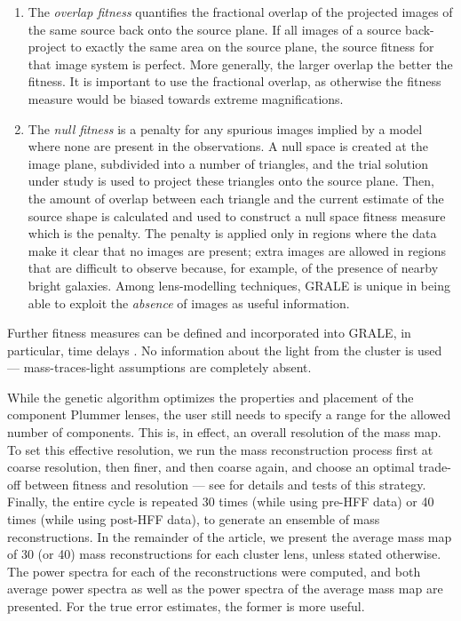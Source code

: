 \documentclass[
  11pt,
  twoside,
  openright,
  titlepage,
  headings=optiontoheadandtoc
]{scrbook}
\begin{document}
\begin{enumerate}

\item The {\em overlap fitness\/} quantifies the fractional overlap of
  the projected images of the same source back onto the source plane.
  If all images of a source back-project to exactly the same area on
  the source plane, the source fitness for that image system is
  perfect.  More generally, the larger overlap the better the fitness.
  It is important to use the fractional overlap, as otherwise the
  fitness measure would be biased towards extreme magnifications.

\item The {\em null fitness\/} is a penalty for any spurious images
  implied by a model where none are present in the observations.
  A null space is created at the image plane, subdivided into a number of
  triangles, and the trial solution
  under study is used to project these triangles onto the source plane. Then, the
  amount of overlap between each triangle and the current estimate of the source
  shape is calculated and used to construct a null space fitness measure which
  is the penalty. The
  penalty is applied only in regions where the data make it clear that
  no images are present; extra images are allowed in regions that are
  difficult to observe because, for example, of the presence of nearby
  bright galaxies.  Among lens-modelling techniques, GRALE is unique
  in being able to exploit the {\em absence\/} of images as useful
  information.

\end{enumerate}

Further fitness measures can be defined and incorporated into GRALE,
in particular, time delays
\citep{2009MNRAS.397..341L,2015PASJ...67...21M}.  No information about
the light from the cluster is used --- mass-traces-light assumptions
are completely absent.

While the genetic algorithm optimizes the properties and placement of
the component Plummer lenses, the user still needs to specify a range
for the allowed number of components.  This is, in effect, an overall
resolution of the mass map.  To set this effective resolution, we run
the mass reconstruction process first at coarse resolution, then
finer, and then coarse again, and choose an optimal trade-off between
fitness and resolution --- see \cite{2014MNRAS.439.2651M} for details
and tests of this strategy.  Finally, the entire cycle is repeated 30
times (while using pre-HFF data) or 40 times (while using post-HFF data),
to generate an ensemble of mass reconstructions. In the remainder
of the article, we present the average mass map of 30 (or 40) mass reconstructions
for each cluster lens, unless stated otherwise. The power spectra
for each of the reconstructions were computed, and both average power spectra
as well as the power spectra of the average mass map are presented. For the true
error estimates, the former is more useful.
\end{document}
